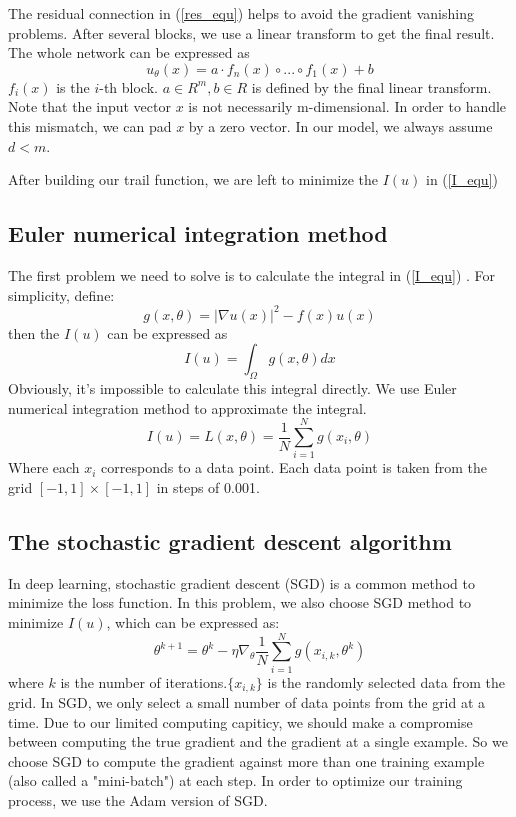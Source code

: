 \documentclass{article}
\begin{document}
\par The residual connection in (\ref{res_equ})
helps to avoid the gradient vanishing problems.
After several blocks, we use a linear transform to get the final result. The whole network can be expressed as
\begin{equation}
u_{\theta}(x)=a\cdot f_n(x) \circ ...\circ f_1(x)+b
\end{equation}
$f_i(x)$ is the $i$-th block. $a\in R^m,b\in R$ is defined by the final linear transform. Note that the input vector $x$ is not necessarily m-dimensional. In order to handle this mismatch, we can pad $x$ by a zero vector. In our model, we always assume $d<m$.
\par After building our trail function, we are left to minimize the $I(u)$ in (\ref{I_equ})

\subsection{Euler numerical integration method}
\par The first problem we need to solve is to calculate the integral in (\ref{I_equ})
 . For simplicity, define:
 \begin{equation}
 g(x,\theta)=|\nabla u(x)|^2-f(x)u(x)
 \end{equation}
 then the $I(u)$ can be expressed as
 \begin{equation}
 I(u)=\int _{\Omega}g(x,\theta)dx
 \end{equation}
 Obviously, it's impossible to calculate this integral directly. We use Euler numerical integration method to approximate the integral.
 \begin{equation}
 I(u)=L(x,\theta)=\frac{1}{N}\sum\limits_{i=1}^{N}g(x_i,\theta)
 \end{equation}
 Where each $x_i$ corresponds to a data point. Each data point is taken from the grid $[-1,1]\times [-1,1]$ in steps of 0.001.
 \subsection{The stochastic gradient descent algorithm}
 In deep learning, stochastic gradient descent (SGD) is a common method to minimize the loss function. In this problem, we also choose SGD method to minimize $I(u)$, which can be expressed as:
 \begin{equation}
 \theta^{k+1}=\theta^{k}-\eta \nabla_{\theta}\frac{1}{N}\sum\limits_{i=1}^{N}g(x_{i,k},\theta^k)
 \end{equation}
 where $k$ is the number of iterations.$\{x_{i,k}\}$ is the randomly selected data from the grid. In SGD, we only select a small number of data points from the grid at a time. Due to our limited computing capiticy, we should make a compromise  between computing the true gradient and the gradient at a single example. So we choose SGD to compute the gradient against more than one training example (also called a "mini-batch") at each step. In order to optimize our training process, we use the Adam version of SGD.
\end{document}
